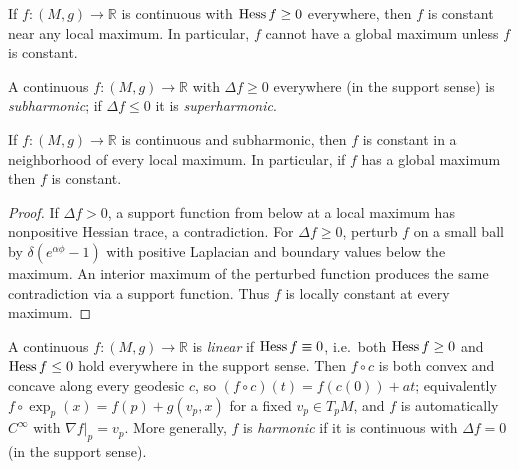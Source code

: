 \begin{theorem}
  \label{thm:pet-ch7-convex-constant-near-max}

  If $f:(M,g)\to\mathbb{R}$ is continuous with $\operatorname{Hess} f\ge0$ everywhere, then $f$ is
  constant near any local maximum. In particular, $f$ cannot have a global
  maximum unless $f$ is constant.
\end{theorem}

\begin{definition}
  \label{def:pet-ch7-subharmonic-superharmonic}

  A continuous $f:(M,g)\to\mathbb{R}$ with $\Delta f\ge0$ everywhere (in the support
  sense) is \emph{subharmonic}; if $\Delta f\le0$ it is \emph{superharmonic}.
\end{definition}

\begin{theorem}
  \label{thm:pet-ch7-strong-maximum-principle}

  If $f:(M,g)\to\mathbb{R}$ is continuous and subharmonic, then $f$ is constant in a
  neighborhood of every local maximum. In particular, if $f$ has a global
  maximum then $f$ is constant.
\end{theorem}
\begin{proof}
  \sketch
  If \(\Delta f>0\), a support function from below at a local maximum has nonpositive Hessian trace, a contradiction. For \(\Delta f\ge0\), perturb \(f\) on a small ball by \(\delta(e^{\alpha\phi}-1)\) with positive Laplacian and boundary values below the maximum. An interior maximum of the perturbed function produces the same contradiction via a support function. Thus \(f\) is locally constant at every maximum.
\end{proof}

\begin{definition}
  \label{def:pet-ch7-linear-harmonic-function}

  A continuous $f:(M,g)\to\mathbb{R}$ is \emph{linear} if $\operatorname{Hess} f\equiv0$, i.e.\
  both $\operatorname{Hess} f\ge0$ and $\operatorname{Hess} f\le0$ hold everywhere in the support sense.
  Then $f\circ c$ is both convex and concave along every geodesic $c$, so
  $(f\circ c)(t)=f(c(0))+at$; equivalently
  $f\circ\exp_p(x)=f(p)+g(v_p,x)$ for a fixed $v_p\in T_pM$, and $f$ is
  automatically $C^\infty$ with $\nabla f|_p=v_p$. More generally, $f$ is
  \emph{harmonic} if it is continuous with $\Delta f=0$ (in the support sense).
\end{definition}

